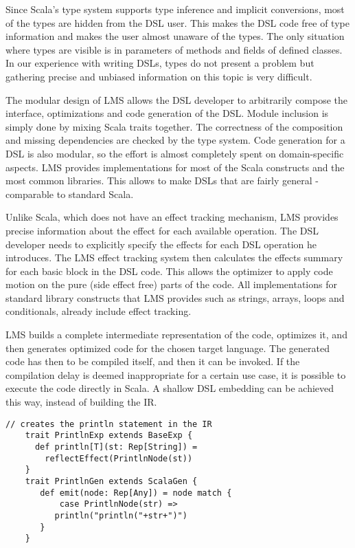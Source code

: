 Since Scala's type system supports type inference and implicit conversions, most
of the  types are hidden from the DSL user. This makes the DSL code
free of type information and makes the user almost unaware of the 
types. The only situation where  types are visible is in
parameters of methods and fields of defined classes. In our experience
with writing DSLs,  types do not present a problem but gathering
precise and unbiased information on this topic is very difficult.

The modular design of LMS allows the DSL developer to arbitrarily compose the
interface, optimizations and code generation of the DSL. Module inclusion is simply done by mixing Scala traits together. The correctness
of the composition and missing dependencies are checked by the type system. Code
generation for a DSL is also modular, so the effort is almost completely spent
on domain-specific aspects. LMS provides implementations for most of
the Scala constructs and the most common libraries. This allows to make DSLs
that are fairly general - comparable to standard Scala.

Unlike Scala, which does not have an effect tracking mechanism, LMS provides
precise information about the effect for each available operation. The DSL
developer needs to explicitly specify the effects for each DSL operation he
introduces. The LMS effect tracking system then calculates the effects summary
for each basic block in the DSL code. This allows the optimizer to apply code
motion on the pure (side effect free) parts of the code. All implementations for
standard library constructs that LMS provides such as strings, arrays, loops and
conditionals, already include effect tracking.

LMS builds a complete intermediate representation of the code, optimizes it, and
then generates optimized code for the chosen target language. The generated code
has then to be compiled itself, and then it can be invoked. If the compilation
delay is deemed inappropriate for a certain use case, it is possible to execute
the code directly in Scala. A shallow DSL embedding can be achieved this way,
instead of building the IR.

\begin{lstlisting}[name=code, caption=Example of how the DSL module is specified. This module is used for measuring a performance of a block of code and can be reused in any other Scala backed DSL. ,captionpos=b, label=lst:println_dsl, float=t]
    // creates the println statement in the IR
    trait PrintlnExp extends BaseExp {
      def println[T](st: Rep[String]) =
        reflectEffect(PrintlnNode(st)) 
    }
    trait PrintlnGen extends ScalaGen {
       def emit(node: Rep[Any]) = node match {
           case PrintlnNode(str) =>
	      println("println("+str+")")
       }
    }
\end{lstlisting}

